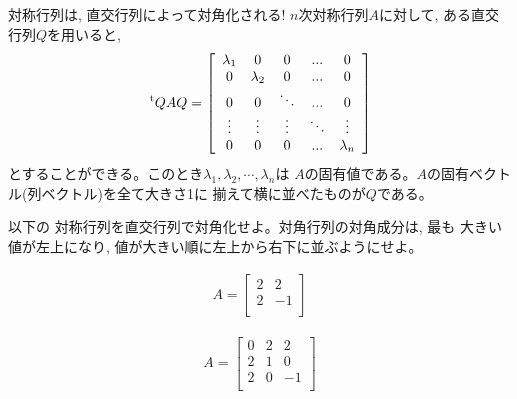 \begin{q}
\begin{itembox}{対称行列は, 直交行列によって対角化される!}
$n$次対称行列$A$に対して, ある直交行列$Q$を用いると, 
\begin{eqnarray*}\,^{\text t}QAQ=\left[\begin{array}{ccccc}
\lambda_1 & 0         & 0       &...     & 0\\
0         & \lambda_2 & 0       &...     & 0\\
0         & 0         & \ddots  &...     & 0\\
\vdots    & \vdots    & \vdots  & \ddots & \vdots\\
0         & 0         & 0       &...     &\lambda_n\\
\end{array}\right]\end{eqnarray*}
とすることができる。このとき$\lambda_1, \lambda_2, \cdots, \lambda_n$は
$A$の固有値である。$A$の固有ベクトル(列ベクトル)を全て大きさ1に
揃えて横に並べたものが$Q$である。
\end{itembox}

\begin{q}\label{q:symmetry_matrix_diagonalize01} 以下の
対称行列を直交行列で対角化せよ。対角行列の対角成分は, 最も
大きい値が左上になり, 値が大きい順に左上から右下に並ぶようにせよ。
\begin{edaenumerate}
\item \begin{eqnarray*} A=\left[\begin{array}{cc}
2 & 2\\
2 & -1\\
\end{array}\right]\end{eqnarray*}
\item \begin{eqnarray*} A=\left[\begin{array}{ccc}
0 & 2 & 2\\
2 & 1 & 0\\
2 & 0 & -1\\
\end{array}\right]\end{eqnarray*}
\end{edaenumerate}\end{q}
\mv
\end{q}

